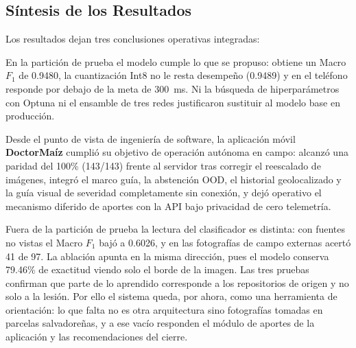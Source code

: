 \subsection{S\'intesis de los Resultados}

Los resultados dejan tres conclusiones operativas integradas:

En la partici\'on de prueba el modelo cumple lo que se propuso: obtiene un Macro $F_1$ de 0.9480, la cuantizaci\'on Int8 no le resta desempe\~no (0.9489) y en el tel\'efono responde por debajo de la meta de 300~ms. Ni la b\'usqueda de hiperpar\'ametros con Optuna ni el ensamble de tres redes justificaron sustituir al modelo base en producci\'on.

Desde el punto de vista de ingenier\'ia de software, la aplicaci\'on m\'ovil \textbf{DoctorMa\'iz} cumpli\'o su objetivo de operaci\'on aut\'onoma en campo: alcanz\'o una paridad del 100\% (143/143) frente al servidor tras corregir el reescalado de im\'agenes, integr\'o el marco gu\'ia, la abstenci\'on OOD, el historial geolocalizado y la gu\'ia visual de severidad completamente sin conexi\'on, y dej\'o operativo el mecanismo diferido de aportes con la API bajo privacidad de cero telemetr\'ia.

Fuera de la partici\'on de prueba la lectura del clasificador es distinta: con fuentes no vistas el Macro $F_1$ baj\'o a 0.6026, y en las fotograf\'ias de campo externas acert\'o 41 de 97. La ablaci\'on apunta en la misma direcci\'on, pues el modelo conserva 79.46\% de exactitud viendo solo el borde de la imagen. Las tres pruebas confirman que parte de lo aprendido corresponde a los repositorios de origen y no solo a la lesi\'on. Por ello el sistema queda, por ahora, como una herramienta de orientaci\'on: lo que falta no es otra arquitectura sino fotograf\'ias tomadas en parcelas salvadore\~nas, y a ese vac\'io responden el m\'odulo de aportes de la aplicaci\'on y las recomendaciones del cierre.
